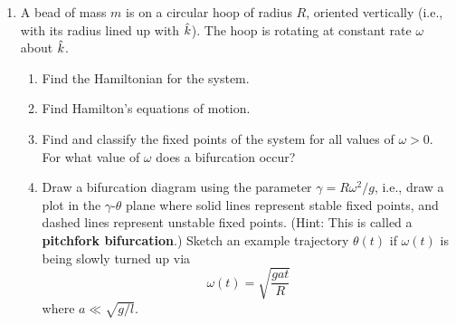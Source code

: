 \documentclass[../psets.tex]{subfiles}
\begin{document}
\begin{enumerate}
    \item A bead of mass $m$ is on a circular hoop of radius $R$, oriented vertically (i.e., with its radius lined up with $\hat{k}$). The hoop is rotating at constant rate $\omega$ about $\hat{k}$.
    \begin{enumerate}
        \item Find the Hamiltonian for the system.
        \item Find Hamilton's equations of motion.
        \item Find and classify the fixed points of the system for all values of $\omega>0$. For what value of $\omega$ does a bifurcation occur?
        \item Draw a bifurcation diagram using the parameter $\gamma=R\omega^2/g$, i.e., draw a plot in the $\gamma$-$\theta$ plane where solid lines represent stable fixed points, and dashed lines represent unstable fixed points. (Hint: This is called a \textbf{pitchfork bifurcation}.) Sketch an example trajectory $\theta(t)$ if $\omega(t)$ is being slowly turned up via
        \begin{equation*}
            \omega(t) = \sqrt{\frac{gat}{R}}
        \end{equation*}
        where $a\ll\sqrt{g/l}$.
    \end{enumerate}
\end{enumerate}
\end{document}
